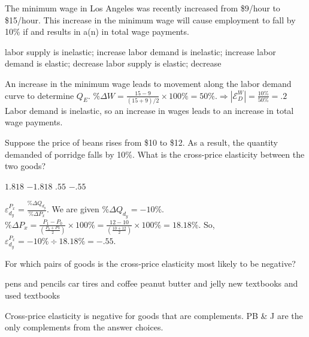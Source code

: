 \documentclass[addpoints,11pt]{exam}
\theoremstyle{definition}
\newcommand{\blank}[0]{\underline{\hspace{3cm}}}
\begin{document}
\begin{questions}
	
	\question The minimum wage in Los Angeles was recently increased from \$9/hour to \$15/hour. This increase in the minimum wage will cause employment to fall by 10\% if \blank and results in a(n) \blank in total wage payments.
		
		\begin{choices}
			\choice labor supply is inelastic; increase
			\CorrectChoice labor demand is inelastic; increase
			\choice labor demand is elastic; decrease
			\choice labor supply is elastic; decrease
		\end{choices}
		
		\begin{solution}
			An increase in the minimum wage leads to movement along the labor demand curve to determine $Q_E$. $\%\Delta W = \frac{15 - 9}{(15+9)/2} \times 100\% = 50\%. \Rightarrow |\mathcal{E}_D^W| = \frac{10\%}{50\%} = .2$ Labor demand is inelastic, so an increase in wages leads to an increase in total wage payments.
		\end{solution}
	

\question Suppose the price of beans rises from \$10 to \$12. As a result, the quantity demanded of porridge falls by 10\%. What is the cross-price elasticity between the two goods?

	\begin{choices}
		\choice $1.818$
		\choice $-1.818$
		\choice $.55$
		\CorrectChoice $-.55$
	\end{choices}
	
\begin{solution}
	$\varepsilon_{d_y}^{P_x} = \frac{\%\Delta Q_{d_y}}{\%\Delta P_x}$. We are given $\%\Delta Q_{d_y} = -10\%$. $\%\Delta P_x = \frac{P_1 - P_0}{(\frac{P_0+P1}{2})} \times 100\% = \frac{12 - 10}{(\frac{10+12}{2})} \times 100\% = 18.18\%.$ So, $\varepsilon_{d_y}^{P_x}  = -10\%\div 18.18\% = -.55$.
\end{solution}	

\question For which pairs of goods is the cross-price elasticity most likely to be negative?

	\begin{choices}
		\choice pens and pencils
		\choice car tires and coffee
		\CorrectChoice peanut butter and jelly
		\choice new textbooks and used textbooks
	\end{choices}
	
	
	\begin{solution}
		Cross-price elasticity is negative for goods that are complements. PB \& J are the only complements from the answer choices.
	\end{solution}


\end{questions}
\end{document}
